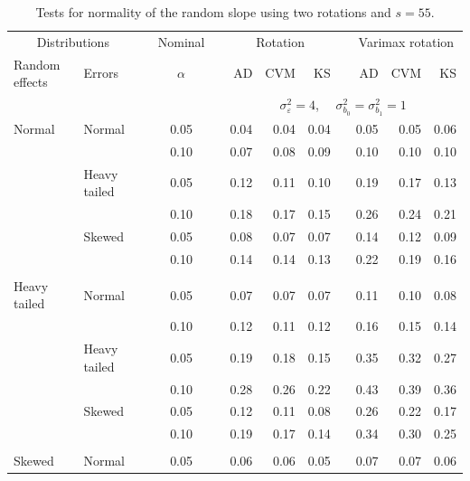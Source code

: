 \documentclass[12pt]{article} %
\begin{document}
\begin{table}[ht]
\caption{Tests for normality of the random slope using two rotations and $s = 55$.}
\begin{scriptsize}
\begin{center}
\begin{tabular}{ll p{.1cm} c p{.1cm} rrr p{.1cm} rrr}
  \hline
  \multicolumn{2}{c}{Distributions}& & Nominal & &  \multicolumn{3}{c}{Rotation} & & \multicolumn{3}{c}{Varimax rotation} \\ \cline{1-2} \cline{6-8} \cline{10-12}   
  Random effects & Errors & & $\alpha$ & & AD & CVM & KS & & AD & CVM & KS \\ 
   \hline
& && && \multicolumn{7}{c}{$\sigma_{\varepsilon}^2 = 4$, \ \ $\sigma_{b_0}^2 = \sigma_{b_1}^2 = 1$} \\ \cline{6-12}
\rowcolor{gray!20}Normal       & Normal       && 0.05 &&  0.04 & 0.04 & 0.04 && 0.05 & 0.05 & 0.06 \\ 
\rowcolor{gray!20}             &              && 0.10 &&  0.07 & 0.08 & 0.09 && 0.10 & 0.10 & 0.10 \\ 
\rowcolor{gray!20}             & Heavy tailed && 0.05 &&  0.12 & 0.11 & 0.10 && 0.19 & 0.17 & 0.13 \\ 
\rowcolor{gray!20}             &              && 0.10 &&  0.18 & 0.17 & 0.15 && 0.26 & 0.24 & 0.21 \\ 
\rowcolor{gray!20}             & Skewed       && 0.05 &&  0.08 & 0.07 & 0.07 && 0.14 & 0.12 & 0.09 \\ 
\rowcolor{gray!20}             &              && 0.10 &&  0.14 & 0.14 & 0.13 && 0.22 & 0.19 & 0.16 \\ 
             &&&&&&&&&&&\\
Heavy tailed & Normal       && 0.05 &&  0.07 & 0.07 & 0.07 && 0.11 & 0.10 & 0.08 \\ 
             &              && 0.10 &&  0.12 & 0.11 & 0.12 && 0.16 & 0.15 & 0.14 \\ 
             & Heavy tailed && 0.05 &&  0.19 & 0.18 & 0.15 && 0.35 & 0.32 & 0.27 \\ 
             &              && 0.10 &&  0.28 & 0.26 & 0.22 && 0.43 & 0.39 & 0.36 \\ 
             & Skewed       && 0.05 &&  0.12 & 0.11 & 0.08 && 0.26 & 0.22 & 0.17 \\ 
             &              && 0.10 &&  0.19 & 0.17 & 0.14 && 0.34 & 0.30 & 0.25 \\ 
             &&&&&&&&&&&\\
Skewed       & Normal       && 0.05 &&  0.06 & 0.06 & 0.05 && 0.07 & 0.07 & 0.06 \\ 

\end{tabular}
\end{center}
\end{scriptsize}
\end{table}
\end{document}
